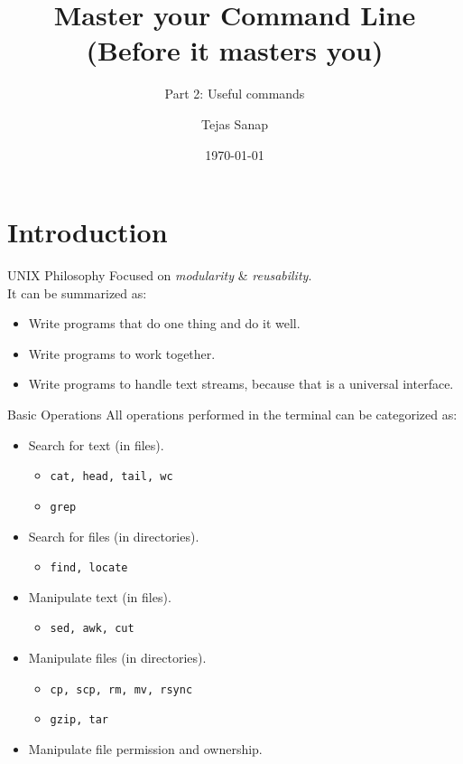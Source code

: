 \documentclass[11pt]{beamer}
\title[PLUG Meetup]{Master your Command Line \\ \small{(Before it masters you)} }
\subtitle{\large{Part 2: Useful commands}}
\author{Tejas Sanap}
\date{\today}
\begin{document}
	\begin{frame}
		\titlepage
	\end{frame}
	\begin{frame}
		\tableofcontents
	\end{frame}

	\section{Introduction}
		\begin{frame}{UNIX Philosophy}
			Focused on \emph{modularity} \& \emph{reusability}. \\
			It can be summarized as:
			\begin{itemize}
				\item Write programs that do one thing and do it well.
				\item Write programs to work together.
				\item Write programs to handle text streams, because that is a universal interface.
			\end{itemize}
		\end{frame}

		\begin{frame}{Basic Operations}
			All operations performed in the terminal can be categorized as:
			\begin{itemize}
				\item Search for text (in files).
					\begin{itemize}
						\item \texttt{cat, head, tail, wc}
						\item \texttt{grep}
					\end{itemize}
				\item Search for files (in directories).
					\begin{itemize}
						\item \texttt{find, locate}
					\end{itemize}
				\item Manipulate text (in files).
					\begin{itemize}
						\item \texttt{sed, awk, cut}
					\end{itemize}
				\item Manipulate files (in directories).
					\begin{itemize}
						\item \texttt{cp, scp, rm, mv, rsync}
						\item \texttt{gzip, tar}
					\end{itemize}
				\item Manipulate file permission and ownership.
			\end{itemize}			
		\end{frame}
\end{document}
